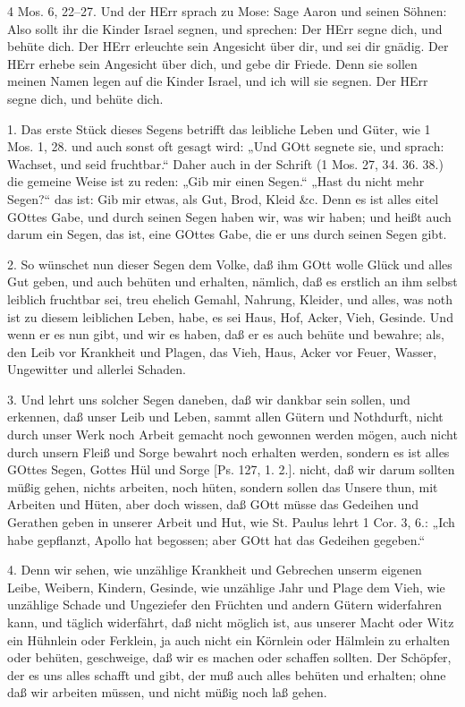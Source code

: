 \begin{schriftzitat}
4 Mos. 6, 22–27. Und der HErr sprach zu Mose: Sage Aaron und seinen Söhnen: Also sollt ihr die Kinder Israel segnen, und sprechen: Der HErr segne dich, und behüte dich. Der HErr erleuchte sein Angesicht über dir, und sei dir gnädig. Der HErr erhebe sein Angesicht über dich, und gebe dir Friede. Denn sie sollen meinen Namen legen auf die Kinder Israel, und ich will sie segnen. Der HErr segne dich, und behüte dich.
\end{schriftzitat}

1. Das erste Stück dieses Segens betrifft das leibliche Leben und Güter, wie 1 Mos. 1, 28. und auch sonst oft gesagt wird: „Und GOtt segnete sie, und sprach: Wachset, und seid fruchtbar.“ Daher auch in der Schrift (1 Mos. 27, 34. 36. 38.) die gemeine Weise ist zu reden: „Gib mir einen Segen.“ „Hast du nicht mehr Segen?“ das ist: Gib mir etwas, als Gut, Brod, Kleid \&c. Denn es ist alles eitel GOttes Gabe, und durch seinen Segen haben wir, was wir haben; und heißt auch darum ein Segen, das ist, eine GOttes Gabe, die er uns durch seinen Segen gibt.

2. So wünschet nun dieser Segen dem Volke, daß ihm GOtt wolle Glück und alles Gut geben, und auch behüten und erhalten, nämlich, daß es erstlich an ihm selbst leiblich fruchtbar sei, treu ehelich Gemahl, Nahrung, Kleider, und alles, was noth ist zu diesem leiblichen Leben, habe, es sei Haus, Hof, Acker, Vieh, Gesinde. Und wenn er es nun gibt, und wir es haben, daß er es auch behüte und bewahre; als, den Leib vor Krankheit und Plagen, das Vieh, Haus, Acker vor Feuer, Wasser, Ungewitter und allerlei Schaden.

3. Und lehrt uns solcher Segen daneben, daß wir dankbar sein sollen, und erkennen, daß unser Leib und Leben, sammt allen Gütern und Nothdurft, nicht durch unser Werk noch Arbeit gemacht noch gewonnen werden mögen, auch nicht durch unsern Fleiß und Sorge bewahrt noch erhalten werden, sondern es ist alles GOttes Segen, Gottes Hül und Sorge [Ps. 127, 1. 2.].
nicht, daß wir darum sollten müßig gehen, nichts arbeiten, noch hüten, sondern sollen das Unsere thun, mit Arbeiten und Hüten, aber doch wissen, daß GOtt müsse das Gedeihen und Gerathen geben in unserer Arbeit und Hut, wie St. Paulus lehrt 1 Cor. 3, 6.: „Ich habe gepflanzt, Apollo hat begossen; aber GOtt hat das Gedeihen gegeben.“

4. Denn wir sehen, wie unzählige Krankheit und Gebrechen unserm eigenen Leibe, Weibern, Kindern, Gesinde, wie unzählige Jahr und Plage dem Vieh, wie unzählige Schade und Ungeziefer den Früchten und andern Gütern widerfahren kann, und täglich widerfährt, daß nicht möglich ist, aus unserer Macht oder Witz ein Hühnlein oder Ferklein, ja auch nicht ein Körnlein oder Hälmlein zu erhalten oder behüten, geschweige, daß wir es machen oder schaffen sollten. Der Schöpfer, der es uns alles schafft und gibt, der muß auch alles behüten und erhalten; ohne daß wir arbeiten müssen, und nicht müßig noch laß gehen.

